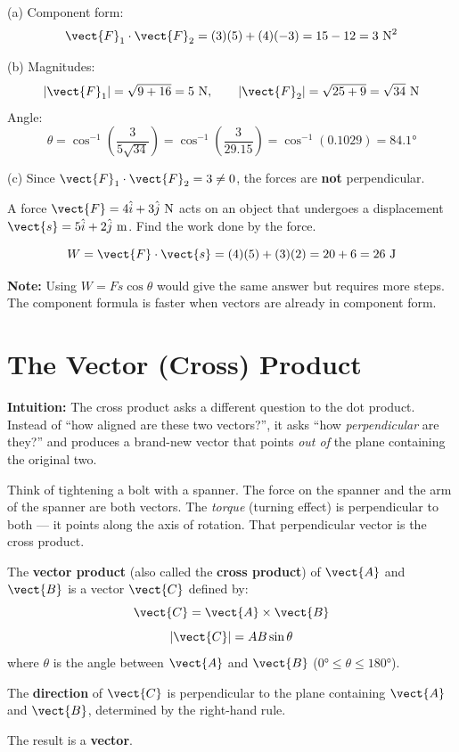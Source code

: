 \begin{solutionbox}
(a) Component form:
\[
  \vect{F}_1 \cdot \vect{F}_2
  = (3)(5) + (4)(-3)
  = 15 - 12 = 3\ \text{N}^2
\]

(b) Magnitudes:
\[
  |\vect{F}_1| = \sqrt{9+16} = 5\ \text{N},\qquad
  |\vect{F}_2| = \sqrt{25+9} = \sqrt{34}\ \text{N}
\]
Angle:
\[
  \theta = \cos^{-1}\!\left(\frac{3}{5\sqrt{34}}\right)
  = \cos^{-1}\!\left(\frac{3}{29.15}\right)
  = \cos^{-1}(0.1029)
  = 84.1°
\]

(c) Since $\vect{F}_1 \cdot \vect{F}_2 = 3 \neq 0$,
the forces are \textbf{not} perpendicular.
\end{solutionbox}

\begin{examplebox}[2.14]
A force $\vect{F} = 4\hat{i} + 3\hat{j}\ \text{N}$
acts on an object that undergoes a displacement
$\vect{s} = 5\hat{i} + 2\hat{j}\ \text{m}$.
Find the work done by the force.
\end{examplebox}

\begin{solutionbox}
\[
  W = \vect{F}\cdot\vect{s}
  = (4)(5) + (3)(2)
  = 20 + 6
  = 26\ \text{J}
\]

\textbf{Note:} Using $W = Fs\cos\theta$ would give
the same answer but requires more steps. The component
formula is faster when vectors are already in
component form.
\end{solutionbox}

\section{The Vector (Cross) Product}
\label{sec:cross_product}

\textbf{Intuition:} The cross product asks a different
question to the dot product. Instead of ``how aligned
are these two vectors?'', it asks ``how
\textit{perpendicular} are they?'' and produces a
brand-new vector that points \textit{out of} the plane
containing the original two.

Think of tightening a bolt with a spanner. The force
on the spanner and the arm of the spanner are both
vectors. The \textit{torque} (turning effect) is
perpendicular to both --- it points along the axis
of rotation. That perpendicular vector is the cross
product.

\begin{definitionbox}
The \textbf{vector product} (also called the
\textbf{cross product}) of $\vect{A}$ and $\vect{B}$
is a vector $\vect{C}$ defined by:
\[
  \vect{C} = \vect{A}\times\vect{B}
\]
\[
  |\vect{C}| = AB\sin\theta
\]
where $\theta$ is the angle between $\vect{A}$ and
$\vect{B}$ ($0° \leq \theta \leq 180°$).

The \textbf{direction} of $\vect{C}$ is perpendicular
to the plane containing $\vect{A}$ and $\vect{B}$,
determined by the right-hand rule.

The result is a \textbf{vector}.
\end{definitionbox}

